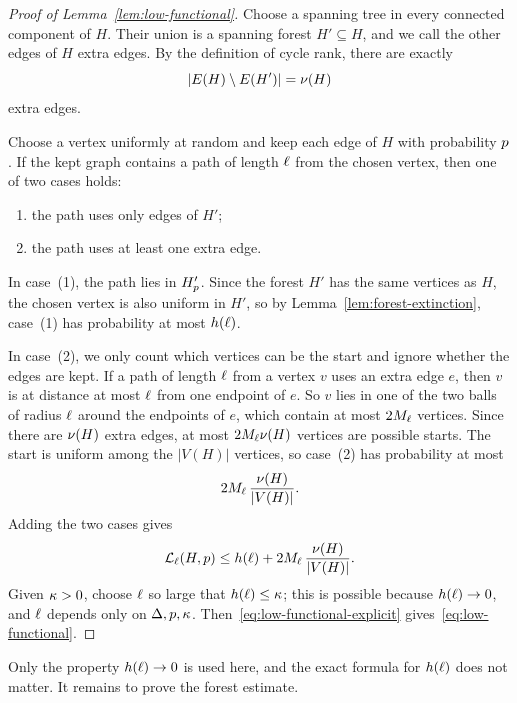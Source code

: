 \begin{proof}[Proof of Lemma~\ref{lem:low-functional}]
Choose a spanning tree in every connected component of \(H\). Their union is a
spanning forest \(H'\subseteq H\), and we call the other edges of \(H\) extra
edges. By the definition of cycle rank, there are exactly
\[
  |E(H)\setminus E(H')|=\nu(H)
\]
extra edges.

Choose a vertex uniformly at random and keep each edge of \(H\) with
probability \(p\). If the kept graph contains a path of length \(\ell\)
from the chosen vertex, then one of two cases holds:
\begin{enumerate}[label=(\arabic*)]
\item the path uses only edges of \(H'\);
\item the path uses at least one extra edge.
\end{enumerate}

In case~(1), the path lies in \(H'_{p}\). Since the forest \(H'\)
has the same vertices as \(H\), the chosen vertex is also uniform in \(H'\), so
by Lemma~\ref{lem:forest-extinction}, case~(1) has probability at most
\(h(\ell)\).

In case~(2), we only count which vertices can be the start and ignore whether
the edges are kept. If a path of length \(\ell\) from a vertex \(v\) uses an
extra edge \(e\), then \(v\) is at distance at most \(\ell\) from one endpoint
of \(e\). So \(v\) lies in one of the two balls of radius \(\ell\) around the
endpoints of \(e\), which contain at most \(2M_{\ell}\) vertices. Since
there are \(\nu(H)\) extra edges, at most \(2M_{\ell}\nu(H)\) vertices
are possible starts. The start is uniform among the \(|V(H)|\) vertices, so
case~(2) has probability at most
\[
  2M_{\ell}\,\frac{\nu(H)}{|V(H)|}.
\]
Adding the two cases gives
\begin{equation}\label{eq:low-functional-explicit}
  \mathcal{L}_{\ell}(H,p)
  \le
  h(\ell)
  +2M_{\ell}\,\frac{\nu(H)}{|V(H)|}.
\end{equation}
Given \(\kappa>0\), choose \(\ell\) so large that \(h(\ell)\le\kappa\); this
is possible because \(h(\ell)\to0\), and \(\ell\) depends only on
\(\Delta,p,\kappa\). Then~\eqref{eq:low-functional-explicit}
gives~\eqref{eq:low-functional}.
\end{proof}

Only the property \(h(\ell)\to0\) is used here, and the exact formula for
\(h(\ell)\) does not matter. It remains to prove the forest estimate.

